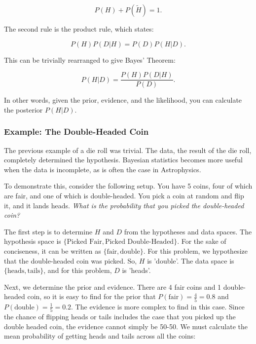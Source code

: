 \documentclass[preprint,longauthor]{aastex631}
\numberwithin{equation}{section}
\begin{document}
\begin{equation}
  P(H) + P(\tilde{H}) = 1.
\end{equation}

The second rule is the product rule, which states:

\begin{equation}
  P(H)P(D|H) = P(D)P(H|D).
\end{equation}

This can be trivially rearranged to give Bayes' Theorem:

\begin{equation}
  \label{eq:bayes_theorem}
  P(H|D) = \frac{P(H)P(D|H)}{P(D)}.
\end{equation}

In other words, given the prior, evidence, and the likelihood, you can calculate the posterior $P(H|D)$.

\subsubsection{Example: The Double-Headed Coin}
The previous example of a die roll was trivial. The data, the result of the die roll, completely determined the hypothesis. Bayesian statistics becomes more useful when the data is incomplete, as is often the case in Astrophysics.

To demonstrate this, consider the following setup. You have 5 coins, four of which are fair, and one of which is double-headed. You pick a coin at random and flip it, and it lands heads. \textit{What is the probability that you picked the double-headed coin?}

The first step is to determine $H$ and $D$ from the hypotheses and data spaces. The hypothesis space is $\{\text{Picked Fair},\text{Picked Double-Headed}\}$. For the sake of conciseness, it can be written as $\{\text{fair},\text{double}\}$. For this problem, we hypothesize that the double-headed coin was picked. So, $H$ is 'double'. The data space is $\{\text{heads},\text{tails}\}$, and for this problem, $D$ is 'heads'.

Next, we determine the prior and evidence. There are 4 fair coins and 1 double-headed coin, so it is easy to find for the prior that $P(\text{fair}) = \frac{4}{5} = 0.8$ and $P(\text{double}) = \frac{1}{5} = 0.2$. The evidence is more complex to find in this case. Since the chance of flipping heads or tails includes the case that you picked up the double headed coin, the evidence cannot simply be 50-50. We must calculate the mean probability of getting heads and tails across all the coins:
\end{document}
